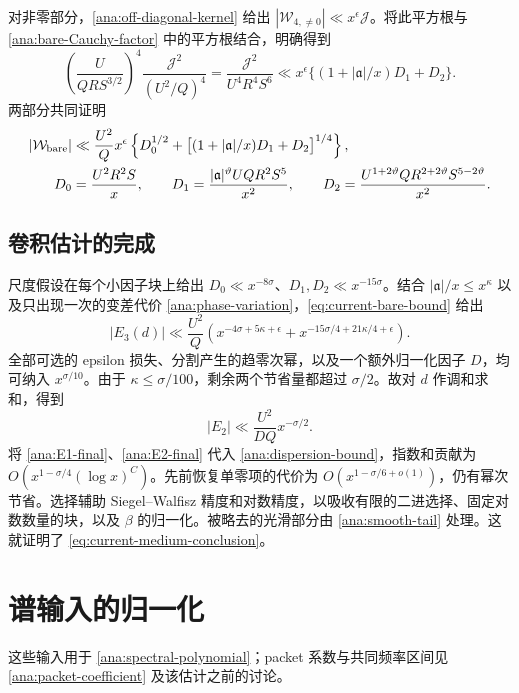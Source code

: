 对非零部分，\eqref{ana:off-diagonal-kernel} 给出 $|\mathcal W_{4,\ne0}|\ll x^\epsilon\mathcal J$。将此平方根与 \eqref{ana:bare-Cauchy-factor} 中的平方根结合，明确得到
\[
 \left(\frac{U}{QRS^{3/2}}\right)^4
 \frac{\mathcal J^2}{(U^2/Q)^4}
 =\frac{\mathcal J^2}{U^4R^4S^6}
 \ll x^\epsilon\bigl\{(1+|\mathfrak a|/x)D_1+D_2\bigr\}.
\]
两部分共同证明
\begin{align}
 |\mathcal W_{\rm bare}|&\ll\frac{U^2}{Q}x^\epsilon
   \left\{D_0^{1/2}
    +\bigl[(1+|\mathfrak{a}|/x)D_1+D_2\bigr]^{1/4}\right\},
 \label{eq:current-bare-bound}\\
 D_0&=\frac{U^2R^2S}{x},\qquad
 D_1=\frac{|\mathfrak{a}|^\vartheta UQR^2S^5}{x^2},\qquad
 D_2=\frac{U^{1+2\vartheta}QR^{2+2\vartheta}S^{5-2\vartheta}}{x^2}.
 \notag
\end{align}

\subsection{卷积估计的完成}

尺度假设在每个小因子块上给出 $D_0\ll x^{-8\sigma}$、$D_1,D_2\ll x^{-15\sigma}$。结合 $|\mathfrak{a}|/x\le x^\kappa$ 以及只出现一次的变差代价 \eqref{ana:phase-variation}，\eqref{eq:current-bare-bound} 给出
\[
 |E_3(d)|\ll\frac{U^2}{Q}
 \left(x^{-4\sigma+5\kappa+\epsilon}
       +x^{-15\sigma/4+21\kappa/4+\epsilon}\right).
\]
全部可选的 epsilon 损失、分割产生的趋零次幂，以及一个额外归一化因子 $D$，均可纳入 $x^{\sigma/10}$。由于 $\kappa\le\sigma/100$，剩余两个节省量都超过 $\sigma/2$。故对 $d$ 作调和求和，得到
\begin{equation}
 |E_2|\ll\frac{U^2}{DQ}x^{-\sigma/2}.
 \label{ana:E2-final}
\end{equation}
将 \eqref{ana:E1-final}、\eqref{ana:E2-final} 代入 \eqref{ana:dispersion-bound}，指数和贡献为 $O(x^{1-\sigma/4}(\log x)^C)$。先前恢复单零项的代价为 $O(x^{1-\sigma/6+o(1)})$，仍有幂次节省。选择辅助 Siegel--Walfisz 精度和对数精度，以吸收有限的二进选择、固定对数数量的块，以及 $\beta$ 的归一化。被略去的光滑部分由 \eqref{ana:smooth-tail} 处理。这就证明了 \eqref{eq:current-medium-conclusion}。

\section{谱输入的归一化}
\label{app:classical}

这些输入用于 \eqref{ana:spectral-polynomial}；packet 系数与共同频率区间见 \eqref{ana:packet-coefficient} 及该估计之前的讨论。

